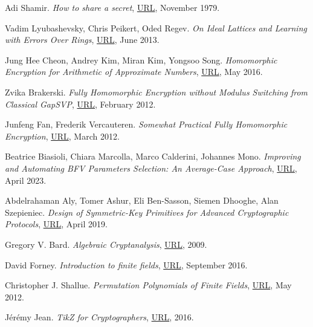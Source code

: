 \documentclass{Resources/UoBLab1}
\theoremstyle{definition}
\begin{document}
\begin{thebibliography}{10}
 Adi Shamir. \textit{How to share a secret}, \href{https://dl.acm.org/doi/pdf/10.1145/359168.359176}{URL}, November 1979.

 Vadim Lyubashevsky, Chris Peikert, Oded Regev. \textit{On Ideal Lattices and Learning with Errors Over Rings}, \href{https://eprint.iacr.org/2012/230.pdf}{URL}, June 2013.

 Jung Hee Cheon, Andrey Kim, Miran Kim, Yongsoo Song. \textit{Homomorphic Encryption for Arithmetic of Approximate Numbers}, \href{https://eprint.iacr.org/2016/421.pdf}{URL}, May 2016.

 Zvika Brakerski. \textit{Fully Homomorphic Encryption without Modulus Switching from Classical GapSVP}, \href{https://eprint.iacr.org/2012/078.pdf}{URL}, February 2012.

 Junfeng Fan, Frederik Vercauteren. \textit{Somewhat Practical Fully Homomorphic Encryption}, \href{https://eprint.iacr.org/2012/144.pdf}{URL}, March 2012.

 Beatrice Biasioli, Chiara Marcolla, Marco Calderini, Johannes Mono. \textit{Improving and Automating BFV Parameters Selection: An Average-Case Approach}, \href{https://eprint.iacr.org/2023/600.pdf}{URL}, April 2023.

 Abdelrahaman Aly, Tomer Ashur, Eli Ben-Sasson, Siemen Dhooghe, Alan Szepieniec. \textit{Design of Symmetric-Key Primitives for Advanced Cryptographic Protocols}, \href{https://eprint.iacr.org/2019/426.pdf}{URL}, April 2019.

 Gregory V. Bard. \textit{Algebraic Cryptanalysis}, \href{https://link.springer.com/book/10.1007/978-0-387-88757-9}{URL}, 2009.

 David Forney. \textit{Introduction to finite fields}, \href{http://web.stanford.edu/~marykw/classes/CS250_W19/readings/Forney_Introduction_to_Finite_Fields.pdf}{URL}, September 2016.

 Christopher J. Shallue. \textit{Permutation Polynomials of Finite Fields}, \href{https://arxiv.org/pdf/1211.6044.pdf}{URL}, May 2012.

 J\'er\'emy Jean. \textit{TikZ for Cryptographers}, \href{https://www.iacr.org/authors/tikz/}{URL}, 2016.

\end{thebibliography}
\end{document}
